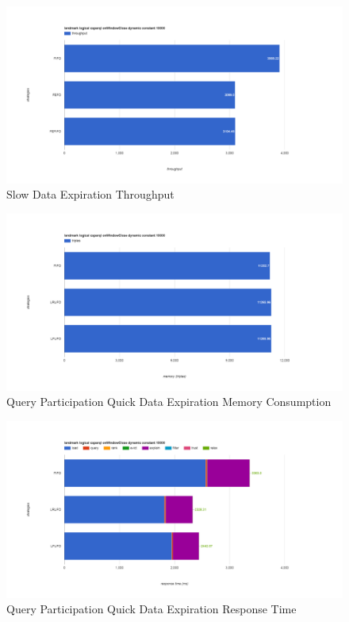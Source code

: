 \begin{figure}[!htbp]
    \centering
    \includegraphics[width=\textwidth]{img/app3-ets-slow-t.png}
    \caption{Slow Data Expiration Throughput}
\end{figure}
\begin{figure}[!htbp]
    \centering
    \includegraphics[width=\textwidth]{img/app3-qp-quick-m.png}
    \caption{Query Participation Quick Data Expiration Memory Consumption}
\end{figure}
\begin{figure}[!htbp]
    \centering
    \includegraphics[width=\textwidth]{img/app3-qp-quick-r.png}
    \caption{Query Participation Quick Data Expiration Response Time}
\end{figure}
